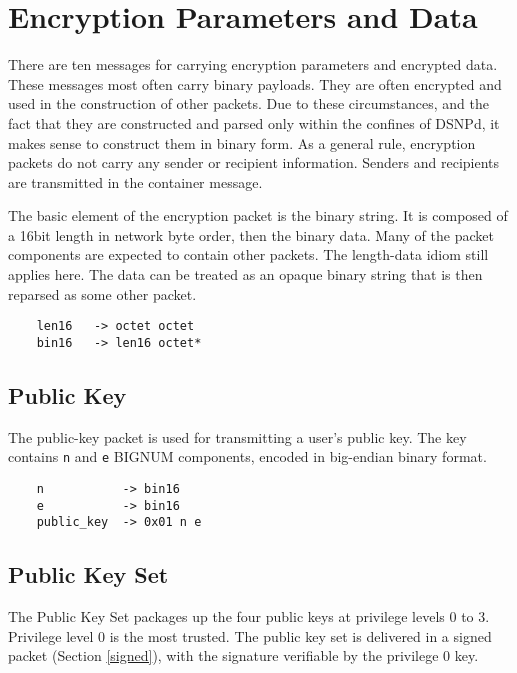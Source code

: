 \documentclass[letterpaper,11pt,oneside]{article}
\begin{document}
\section{Encryption Parameters and Data}

There are ten messages for carrying encryption parameters and encrypted data.
These messages most often carry binary payloads. They are often encrypted and
used in the construction of other packets. Due to these circumstances, and the
fact that they are constructed and parsed only within the confines of DSNPd, it
makes sense to construct them in binary form. As a general rule, encryption
packets do not carry any sender or recipient information. Senders and
recipients are transmitted in the container message.

The basic element of the encryption packet is the binary string. It is composed
of a 16bit length in network byte order, then the binary data. Many of the
packet components are expected to contain other packets. The length-data idiom
still applies here. The data can be treated as an opaque binary string that is
then reparsed as some other packet.

\vspace{10pt}
\begin{verbatim}
    len16   -> octet octet
    bin16   -> len16 octet*
\end{verbatim}
\vspace{10pt}

\subsection{Public Key}
\label{public-key-packet}

The public-key packet is used for transmitting a user's public key. The key
contains \verb|n| and \verb|e| BIGNUM components, encoded in big-endian binary
format. 

\vspace{10pt}
\begin{verbatim}
    n           -> bin16
    e           -> bin16
    public_key  -> 0x01 n e
\end{verbatim}
\vspace{10pt}

\subsection{Public Key Set}
\label{public-key-set}

The Public Key Set packages up the four public keys at privilege levels 0 to 3.
Privilege level 0 is the most trusted. The public key set is delivered in a
signed packet (Section \ref{signed}), with the signature verifiable by the
privilege 0 key.
\end{document}
